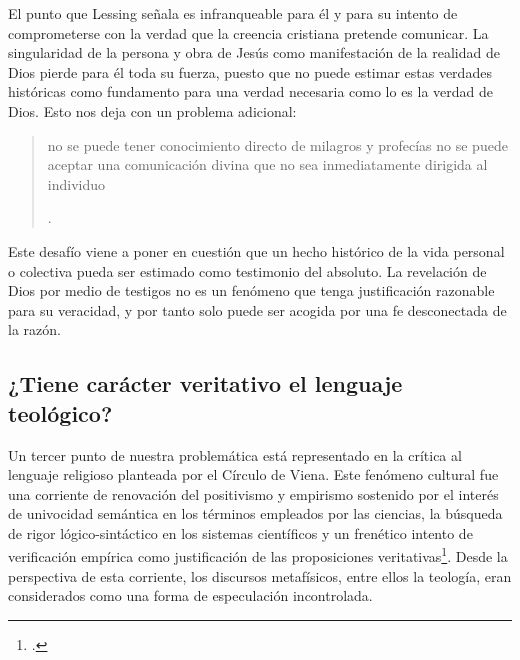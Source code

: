 El punto que Lessing señala es infranqueable para él y para su intento de comprometerse con la verdad que la creencia cristiana pretende comunicar. La singularidad de la persona y obra de Jesús como manifestación de la realidad de Dios pierde para él toda su fuerza, puesto que no puede estimar estas verdades históricas como fundamento para una verdad necesaria como lo es la verdad de Dios. Esto nos deja con un problema adicional: \blockquote[{\Cite[294]{prades2015testimonio}}.]{no se puede tener conocimiento directo de milagros y profecías \textelp{} no se puede aceptar una comunicación divina que no sea inmediatamente dirigida al individuo}.

Este desafío viene a poner en cuestión que un hecho histórico de la vida personal o colectiva pueda ser estimado como testimonio del absoluto. La revelación de Dios por medio de testigos no es un fenómeno que tenga justificación razonable para su veracidad, y por tanto solo puede ser acogida por una fe desconectada de la razón.

\subsection{¿Tiene carácter veritativo el lenguaje teológico?}

Un tercer punto de nuestra problemática está representado en la crítica al lenguaje religioso planteada por el Círculo de Viena. Este fenómeno cultural fue una corriente de renovación del positivismo y empirismo sostenido por el interés de univocidad semántica en los términos empleados por las ciencias, la búsqueda de rigor lógico-sintáctico en los sistemas científicos y un frenético intento de verificación empírica como justificación de las proposiciones veritativas\footcite[Cf.][152]{dominguez2009at}. Desde la perspectiva de esta corriente, los discursos metafísicos, entre ellos la teología, eran considerados como una forma de especulación incontrolada.

